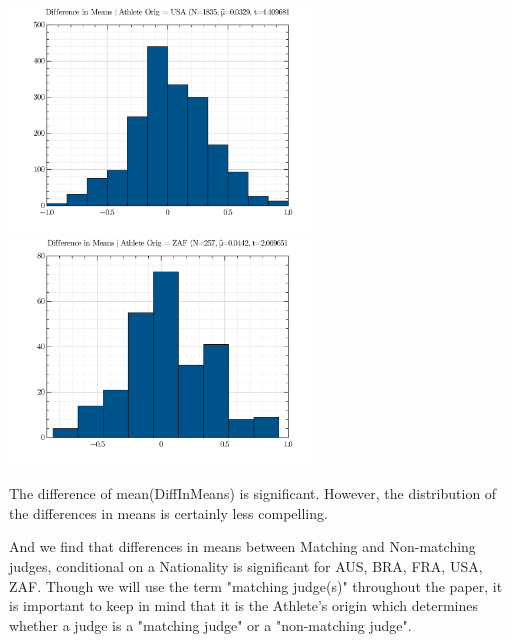 \documentclass{article}
\theoremstyle{definition}
\begin{document}
\includegraphics[width=8cm]{./src/visuals/DistOfDiffInMeansForUSA.png}
\includegraphics[width=8cm]{./src/visuals/DistOfDiffInMeansForZAF.png}

The difference of mean(DiffInMeans) is significant. However, the distribution of the differences in means is certainly less compelling. 

And we find that differences in means between Matching and Non-matching judges, conditional on a Nationality is significant for AUS, BRA, FRA, USA, ZAF. Though we will use the term "matching judge(s)" throughout the paper, it is important to keep in mind that it is the Athlete's origin which determines whether a judge is a "matching judge" or a "non-matching judge".
\end{document}
